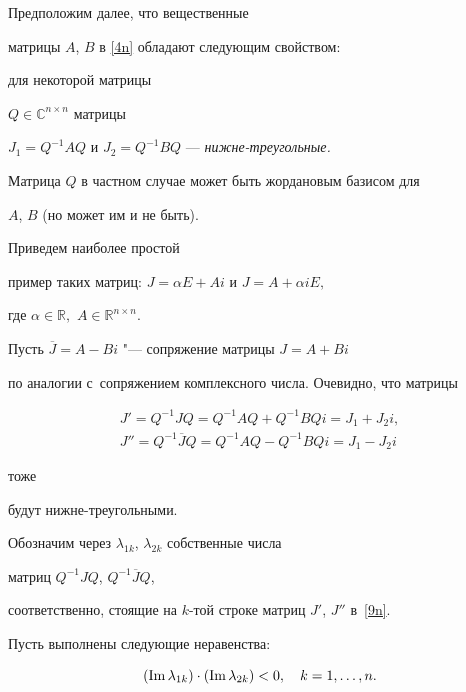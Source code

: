 \smallskip

Предположим далее, что вещественные

матрицы $A$, $B$  в \eqref{4n} обладают  следующим свойством:

для некоторой матрицы

 $Q\in\mathbb{C}^{n\times n}$ матрицы

 $J_1=Q^{-1}AQ$ и $J_2=Q^{-1}BQ$  --- {\it нижне-треугольные. }

 Матрица $Q$ в частном случае может быть  жордановым базисом для

 $A$, $B$ (но может им и не быть). 

 Приведем наиболее простой

  пример таких матриц: $J=\alpha E+Ai$ и $J=A+\alpha iE,$

 где $\alpha\in\mathbb{R},$ $A\in\mathbb{R}^{n\times n}.$





Пусть $\overline{J}=A-Bi$ "--- сопряжение матрицы $J=A+Bi$

по аналогии с~сопряжением комплексного числа. Очевидно, что матрицы

\begin{equation}

\begin{array}{l}

J'=Q^{-1}JQ=Q^{-1}AQ+Q^{-1}BQi=J_1+J_2i,\\

J''=Q^{-1}\overline{J}Q=Q^{-1}AQ-Q^{-1}BQi=J_1-J_2i

\end{array}

\label{9n}

\end{equation}

тоже

будут  нижне-треугольными.



  Обозначим через   $\lambda_{1k}$, $\lambda_{2k}$ собственные  числа

  матриц $Q^{-1}JQ$,  $Q^{-1}\overline{J}Q$,

  соответственно,  стоящие на $k$-той строке матриц $J'$, $J''$ в~\eqref{9n}.





    Пусть  выполнены следующие неравенства:

\begin{equation}

\left(\mathop{\rm Im}\lambda_{1k} \right)\cdot \left(\mathop{\rm Im} \lambda_{2k} \right)<0,\quad  k=1,\ldots,n.

 \label{10n}

\end{equation}



